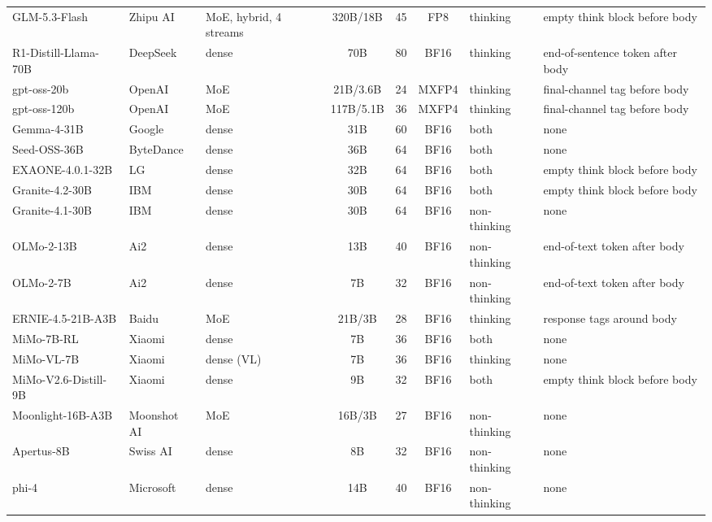 \begin{table}[htbp]
\begin{tabular}{ll>{\raggedright\arraybackslash}p{1.65cm}cccl>{\raggedright\arraybackslash}p{2.5cm}}
GLM-5.3-Flash & Zhipu AI & MoE, hybrid, 4 streams & 320B/18B & 45 & FP8 & thinking & empty think block before body \\
R1-Distill-Llama-70B & DeepSeek & dense & 70B & 80 & BF16 & thinking & end-of-sentence token after body \\
gpt-oss-20b & OpenAI & MoE & 21B/3.6B & 24 & MXFP4 & thinking & final-channel tag before body \\
gpt-oss-120b & OpenAI & MoE & 117B/5.1B & 36 & MXFP4 & thinking & final-channel tag before body \\
Gemma-4-31B & Google & dense & 31B & 60 & BF16 & both & none \\
Seed-OSS-36B & ByteDance & dense & 36B & 64 & BF16 & both & none \\
EXAONE-4.0.1-32B & LG & dense & 32B & 64 & BF16 & both & empty think block before body \\
Granite-4.2-30B & IBM & dense & 30B & 64 & BF16 & both & empty think block before body \\
Granite-4.1-30B & IBM & dense & 30B & 64 & BF16 & non-thinking & none \\
OLMo-2-13B & Ai2 & dense & 13B & 40 & BF16 & non-thinking & end-of-text token after body \\
OLMo-2-7B & Ai2 & dense & 7B & 32 & BF16 & non-thinking & end-of-text token after body \\
ERNIE-4.5-21B-A3B & Baidu & MoE & 21B/3B & 28 & BF16 & thinking & response tags around body \\
MiMo-7B-RL & Xiaomi & dense & 7B & 36 & BF16 & both & none \\
MiMo-VL-7B & Xiaomi & dense (VL) & 7B & 36 & BF16 & thinking & none \\
MiMo-V2.6-Distill-9B & Xiaomi & dense & 9B & 32 & BF16 & both & empty think block before body \\
Moonlight-16B-A3B & Moonshot AI & MoE & 16B/3B & 27 & BF16 & non-thinking & none \\
Apertus-8B & Swiss AI & dense & 8B & 32 & BF16 & non-thinking & none \\
phi-4 & Microsoft & dense & 14B & 40 & BF16 & non-thinking & none \\
\bottomrule
\end{tabular}
\end{table}

